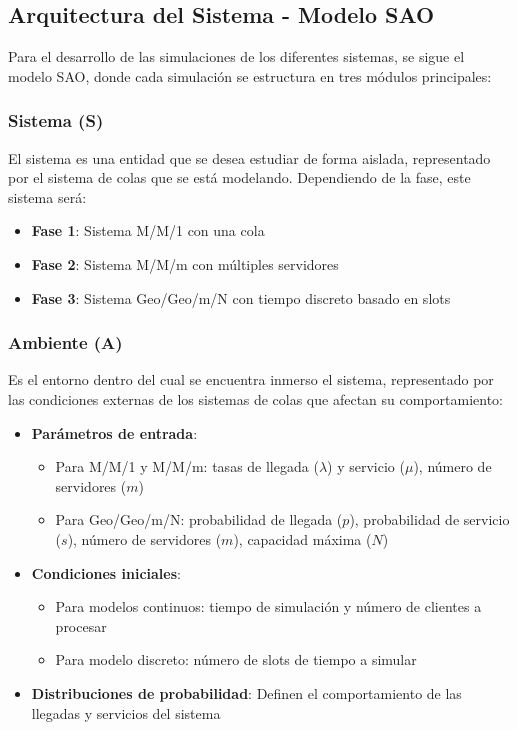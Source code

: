 \documentclass{article}
\begin{document}
\subsection{Arquitectura del Sistema - Modelo SAO}

Para el desarrollo de las simulaciones de los diferentes sistemas, se sigue el modelo SAO, donde cada simulación se estructura en tres módulos principales:

\subsubsection{Sistema (S)}

El sistema es una entidad que se desea estudiar de forma aislada, representado por el sistema de colas que se está modelando. Dependiendo de la fase, este sistema será:

\begin{itemize}
    \item \textbf{Fase 1}: Sistema M/M/1 con una cola
    \item \textbf{Fase 2}: Sistema M/M/m con múltiples servidores  
    \item \textbf{Fase 3}: Sistema Geo/Geo/m/N con tiempo discreto basado en slots
\end{itemize}

\subsubsection{Ambiente (A)}

Es el entorno dentro del cual se encuentra inmerso el sistema, representado por las condiciones externas de los sistemas de colas que afectan su comportamiento:

\begin{itemize}
    \item \textbf{Parámetros de entrada}:
    \begin{itemize}
        \item Para M/M/1 y M/M/m: tasas de llegada ($\lambda$) y servicio ($\mu$), número de servidores ($m$)
        \item Para Geo/Geo/m/N: probabilidad de llegada ($p$), probabilidad de servicio ($s$), número de servidores ($m$), capacidad máxima ($N$)
    \end{itemize}
    \item \textbf{Condiciones iniciales}:
    \begin{itemize}
        \item Para modelos continuos: tiempo de simulación y número de clientes a procesar
        \item Para modelo discreto: número de slots de tiempo a simular
    \end{itemize}
    \item \textbf{Distribuciones de probabilidad}: Definen el comportamiento de las llegadas y servicios del sistema
\end{itemize}
\end{document}
